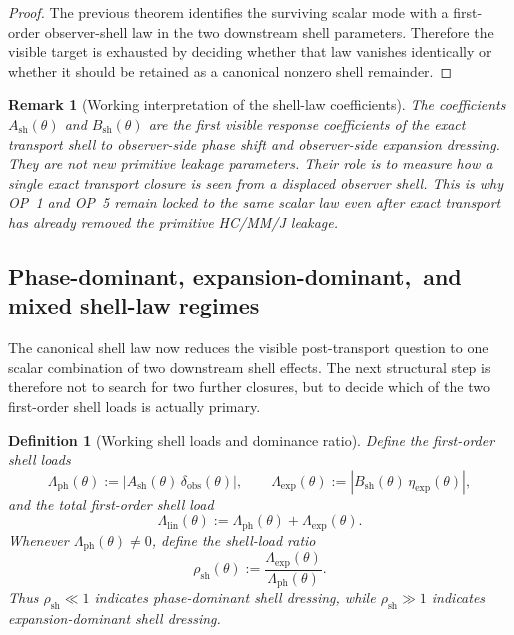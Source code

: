 \documentclass[12pt,a4paper]{article}
\newtheorem{definition}[theorem]{Definition}
\newtheorem{remark}[theorem]{Remark}
\begin{document}
\begin{proof}
The previous theorem identifies the surviving scalar mode with a first-order observer-shell law in the two downstream shell parameters. Therefore the visible target is exhausted by deciding whether that law vanishes identically or whether it should be retained as a canonical nonzero shell remainder.
\end{proof}

\begin{remark}[Working interpretation of the shell-law coefficients]
The coefficients $A_{\mathrm{sh}}(\theta)$ and $B_{\mathrm{sh}}(\theta)$ are the first visible response coefficients of the exact transport shell to observer-side phase shift and observer-side expansion dressing. They are not new primitive leakage parameters. Their role is to measure how a single exact transport closure is seen from a displaced observer shell. This is why OP~1 and OP~5 remain locked to the same scalar law even after exact transport has already removed the primitive HC/MM/J leakage.
\end{remark}


\subsection*{Phase-dominant, expansion-dominant,\ and mixed shell-law regimes}
The canonical shell law now reduces the visible post-transport question to one scalar combination of two downstream shell effects. The next structural step is therefore not to search for two further closures, but to decide which of the two first-order shell loads is actually primary.

\begin{definition}[Working shell loads and dominance ratio]
Define the first-order shell loads
\[
 \Lambda_{\mathrm{ph}}(\theta):=|A_{\mathrm{sh}}(\theta)\,\delta_{\mathrm{obs}}(\theta)|,
 \qquad
 \Lambda_{\mathrm{exp}}(\theta):=|B_{\mathrm{sh}}(\theta)\,\eta_{\mathrm{exp}}(\theta)|,
\]
and the total first-order shell load
\[
 \Lambda_{\mathrm{lin}}(\theta):=\Lambda_{\mathrm{ph}}(\theta)+\Lambda_{\mathrm{exp}}(\theta).
\]
Whenever $\Lambda_{\mathrm{ph}}(\theta)\neq 0$, define the shell-load ratio
\[
 \rho_{\mathrm{sh}}(\theta):=\frac{\Lambda_{\mathrm{exp}}(\theta)}{\Lambda_{\mathrm{ph}}(\theta)}.
\]
Thus $\rho_{\mathrm{sh}}\ll 1$ indicates phase-dominant shell dressing, while $\rho_{\mathrm{sh}}\gg 1$ indicates expansion-dominant shell dressing.
\end{definition}
\end{document}
